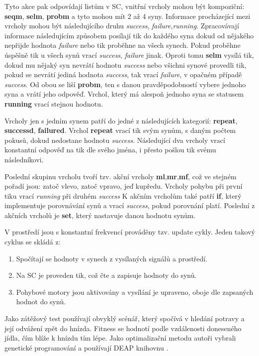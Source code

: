\par
Tyto akce pak odpovídají listům v SC, vnitřní vrcholy mohou být kompoziční: \textbf{seqm}, \textbf{selm}, \textbf{probm} a tyto mohou mít 2 až 4 syny. Informace procházející mezi vrcholy mohou být následujícího druhu \textit{success}, \textit{failure},\textit{running}. Zpracovávají informace následujícím způsobem posílají tik do každého syna dokud od nějakého nepřijde hodnota \textit{failure} nebo tik proběhne na všech synech. Pokud proběhne úspěšně tik u všech synů vrací \textit{success}, \textit{failure} jinak. Oproti tomu \textbf{selm} vysílá tik, dokud mu nějaký syn nevrátí hodnotu \textit{success} nebo všichni synové provedli tik, pokud se nevrátí jediná hodnota \textit{success}, tak vrací \textit{failure}, v opačném případě \textit{success}. Od obou se liší \textbf{probm}, ten s danou pravděpodobností vybere jednoho syna a vrátí jeho odpověď. Vrchol, který má alespoň jednoho syna se statusem \textbf{running} vrací stejnou hodnotu. \par
Vrcholy jen s jedním synem patří do jedné z následujících kategorií: \textbf{repeat}, \textbf{successd}, \textbf{failured}. Vrchol \textbf{repeat} vrací tik svým synům, s daným počtem pokusů, dokud nedostane hodnotu \textit{success}. Následující dva vrcholy vrací konstantní odpověď na tik dle svého jména, i přesto pošlou tik svému následníkovi. \par
Poslední skupinu vrcholu tvoří tzv. akční vrcholy \textbf{ml},\textbf{mr},\textbf{mf}, což ve stejném pořadí jsou: zatoč vlevo, zatoč vpravo, jeď kupředu. Vrcholy pohybu při první tiku vrací \textit{running} při druhém \textit{success} K akčním vrcholům také patří \textbf{if}, který implementuje porovnávání synů a vrací \textit{success}, pokud porovnání platí. Poslední z akčních vrcholů je \textbf{set}, který nastavuje danou hodnotu synům. 
\par
V prostředí jsou s konstantní frekvencí prováděny tzv. update cykly. Jeden takový cyklus se skládá z: 
\par
\begin{enumerate}
    \item Spočítají se hodnoty v synech z vysílaných signálů a prostředí. 
    \item Na SC je proveden tik, což čte a zapisuje hodnoty do synů. 
    \item Pohybové motory jsou aktivovány a vysílání je upraveno, oboje dle zapsaných hodnot do synů.
\end{enumerate}
\par 
Jako zátěžový test používají obvyklý scénář, který spočívá v hledání potravy a její odvážení zpět do hnízda. Fitness se hodnotí podle vzdálenosti doneseného jídla, čím blíže k hnízdu tím lépe. Jako optimalizační metodu autoři vybrali genetické programování a používají DEAP knihovnu \cite{deap}. \
